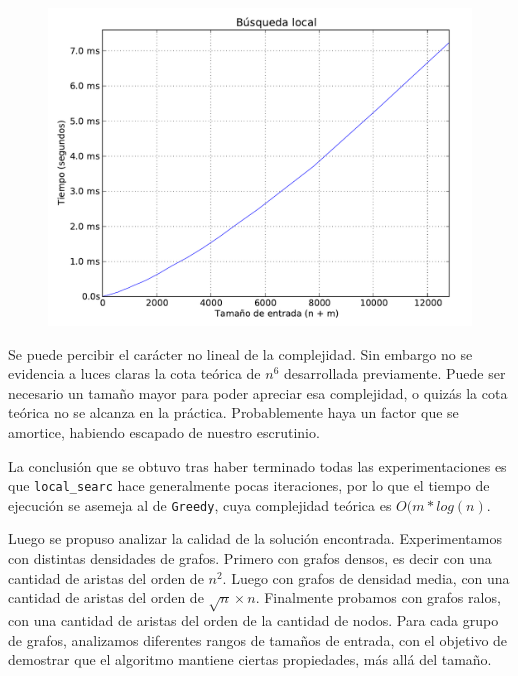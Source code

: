 \begin{figure}[H]
\begin{center}
\includegraphics[angle=0, scale=.75]{imagenes/local_search_time.pdf}
\label{grafico local}
\end{center}
\end{figure}


Se puede percibir el carácter no lineal de la complejidad. Sin embargo no se evidencia a luces claras la cota teórica de $n^6$ desarrollada
previamente. Puede ser necesario un tamaño mayor para poder apreciar esa complejidad, o quizás la cota teórica no se alcanza en la práctica.
Probablemente haya un factor que se amortice, habiendo escapado de nuestro escrutinio.

La conclusión que se obtuvo tras haber terminado todas las experimentaciones es que \texttt{local\_searc} hace generalmente pocas iteraciones, por lo que el tiempo de ejecución se asemeja al de \texttt{Greedy}, cuya complejidad teórica es $O(m*log(n)$.

\newpage
Luego se propuso analizar la calidad de la solución encontrada.
Experimentamos con distintas densidades de grafos. Primero con grafos densos, es decir con una cantidad de aristas del orden de $n^2$. Luego con
grafos de densidad media, con una cantidad de aristas del orden de $\sqrt{n} \times n$. Finalmente probamos con grafos ralos, con una cantidad de aristas
del orden de la cantidad de nodos. Para cada grupo de grafos, analizamos diferentes rangos de tamaños de entrada, con el objetivo de demostrar
que el algoritmo mantiene ciertas propiedades, más allá del tamaño.

